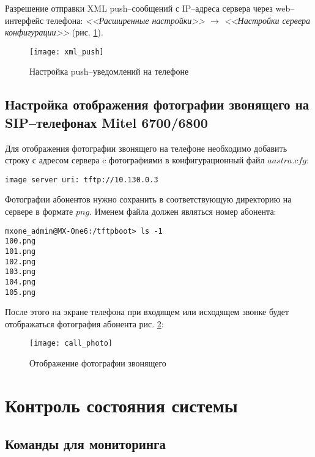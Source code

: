 Разрешение отправки XML push--сообщений с IP--адреса сервера через web--интерфейс телефона: 
{\em <<Расширенные настройки>> $\rightarrow$ <<Настройки сервера конфигурации>>} (рис. \ref{img:xml_push}). 
\begin{figure}[!ht]
  \center
  \texttt{[image: xml\_push]}
  \caption{Настройка push--уведомлений на телефоне}
  \label{img:xml_push}
\end{figure}

\subsection{Настройка отображения фотографии звонящего на SIP--телефонах Mitel 6700/6800}

Для отображения фотографии звонящего на телефоне необходимо добавить строку с адресом сервера c фотографиями в конфигурационный файл $aastra.cfg$: 
\begin{lstlisting}
image server uri: tftp://10.130.0.3
\end{lstlisting}

Фотографии абонентов нужно сохранить в соответствующую директорию на сервере в формате $png$. Именем файла должен являться номер абонента: 
\begin{lstlisting}
mxone_admin@MX-One6:/tftpboot> ls -1
100.png
101.png
102.png
103.png
104.png
105.png
\end{lstlisting}

После этого на экране телефона при входящем или исходящем звонке будет отображаться фотография абонента рис. \ref{img:call_photo}:
\begin{figure}[!ht]
  \center
  \texttt{[image: call\_photo]}
  \caption{Отображение фотографии звонящего}
  \label{img:call_photo}
\end{figure}

\section{Контроль состояния системы}

\subsection{Команды для мониторинга}

